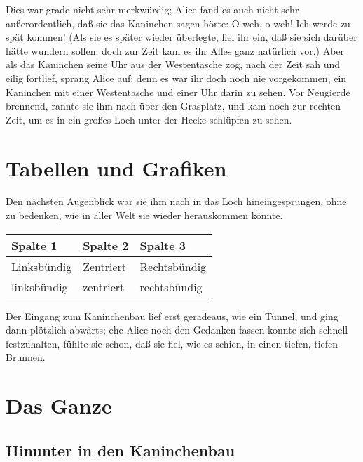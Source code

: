 \documentclass[DIV=calc,10pt,parskip=half,twocolumn]{scrartcl}
\begin{document}
Dies war grade nicht sehr merkwürdig; Alice fand es auch nicht sehr
außerordentlich, daß sie das Kaninchen sagen hörte: \grqq{} O weh, o weh! Ich werde zu
spät kommen!\grqq{}  (Als sie es später wieder überlegte, fiel ihr ein, daß sie sich
darüber hätte wundern sollen; doch zur Zeit kam es ihr Alles ganz natürlich
vor.) Aber als das Kaninchen seine Uhr aus der Westentasche zog, nach der Zeit
sah und eilig fortlief, sprang Alice auf; denn es war ihr doch noch nie
vorgekommen, ein Kaninchen mit einer Westentasche und einer Uhr darin zu sehen.
Vor Neugierde brennend, rannte sie ihm nach über den Grasplatz, und kam noch
zur rechten Zeit, um es in ein großes Loch unter der Hecke schlüpfen zu sehen.




\section{Tabellen und Grafiken}

Den nächsten Augenblick war sie ihm nach in das Loch hineingesprungen, ohne zu
bedenken, wie in aller Welt sie wieder herauskommen könnte.

\begin{center}
\begin{tabular}{lll}
  \toprule
   Spalte 1 &  Spalte 2 & Spalte 3\\
   \midrule
   Linksbündig & Zentriert & Rechtsbündig\\
   linksbündig & zentriert & rechtsbündig\\
   \bottomrule
\end{tabular}
\end{center}

Der Eingang zum Kaninchenbau lief erst geradeaus, wie ein Tunnel, und ging dann
plötzlich abwärts; ehe Alice noch den Gedanken fassen konnte sich schnell
festzuhalten, fühlte sie schon, daß sie fiel, wie es schien, in einen tiefen,
tiefen Brunnen.


\clearpage


\section{Das Ganze}



\subsection{Hinunter in den Kaninchenbau}
\end{document}
